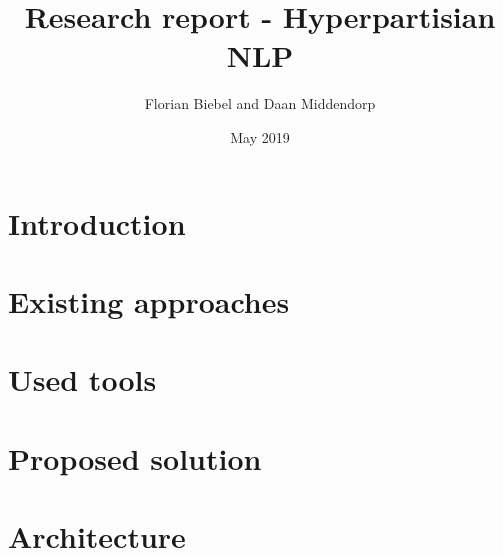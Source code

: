 \documentclass{article}
\title{Research report - Hyperpartisian NLP}
\author{Florian Biebel and Daan Middendorp}
\date{May 2019}
\begin{document}
\maketitle

\section{Introduction}
\section{Existing approaches}
\section{Used tools}
\section{Proposed solution}
\section{Architecture}
\end{document}
